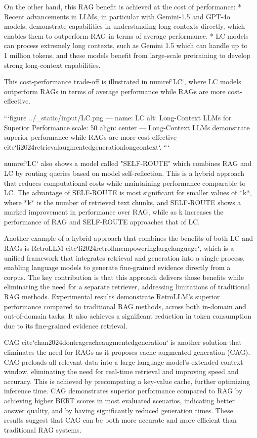 {{On the other hand, this RAG benefit is achieved at the cost of performance:
*   Recent advancements in LLMs, in particular with Gemini-1.5 and GPT-4o models, demonstrate capabilities in understanding long contexts directly, which enables them to outperform RAG in terms of average performance.
*   LC models can process extremely long contexts, such as Gemini 1.5 which can handle up to 1 million tokens, and these models benefit from large-scale pretraining to develop strong long-context capabilities.

This cost-performance trade-off is illustrated in {numref}`LC`, where LC models outperform RAGs in terms of average performance while RAGs are more cost-effective.

```{figure} ../_static/input/LC.png
---
name: LC
alt: Long-Context LLMs for Superior Performance
scale: 50%
align: center
---
Long-Context LLMs demonstrate superior performance while RAGs are more cost-effective {cite}`li2024retrievalaugmentedgenerationlongcontext`.
```

{numref}`LC` also shows a model called "SELF-ROUTE" which combines RAG and LC by routing queries based on model self-reflection. This is a hybrid approach that reduces computational costs while maintaining performance comparable to LC. The advantage of SELF-ROUTE is most significant for smaller values of *k*, where *k* is the number of retrieved text chunks, and SELF-ROUTE shows a marked improvement in performance over RAG, while as k increases the performance of RAG and SELF-ROUTE approaches that of LC.

Another example of a hybrid approach that combines the benefits of both LC and RAGs is RetroLLM {cite}`li2024retrollmempoweringlargelanguage`, which is a unified framework that integrates retrieval and generation into a single process, enabling language models to generate fine-grained evidence directly from a corpus. The key contribution is that this approach delivers those benefits while eliminating the need for a separate retriever, addressing limitations of traditional RAG methods. Experimental results demonstrate RetroLLM's superior performance compared to traditional RAG methods, across both in-domain and out-of-domain tasks. It also achieves a significant reduction in token consumption due to its fine-grained evidence retrieval.

CAG {cite}`chan2024dontragcacheaugmentedgeneration` is another solution that eliminates the need for RAGs as it proposes cache-augmented generation (CAG). CAG preloads all relevant data into a large language model's extended context window, eliminating the need for real-time retrieval and improving speed and accuracy. This is achieved by precomputing a key-value cache, further optimizing inference time. CAG demonstrates superior performance compared to RAG by achieving higher BERT scores in most evaluated scenarios, indicating better answer quality, and by having significantly reduced generation times. These results suggest that CAG can be both more accurate and more efficient than traditional RAG systems.

}}
